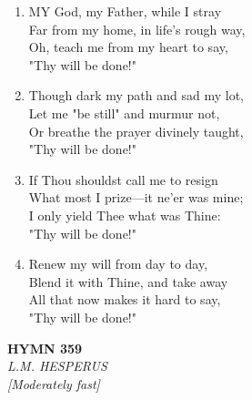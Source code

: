 \begin{enumerate}
    \item MY God, my Father, while I stray \\
        Far from my home, in life's rough way, \\
        Oh, teach me from my heart to say, \\
        "Thy will be done!"

    \item Though dark my path and sad my lot, \\
        Let me "be still" and murmur not, \\
        Or breathe the prayer divinely taught, \\
        "Thy will be done!"

    \item If Thou shouldst call me to resign \\
        What most I prize---it ne'er was mine; \\
        I only yield Thee what was Thine: \\
        "Thy will be done!"

    \item Renew my will from day to day, \\
        Blend it with Thine, and take away \\
        All that now makes it hard to say, \\
        "Thy will be done!"

\end{enumerate}

\newpage
\begin{center}
    {\Large \textbf{HYMN 359}}
    \\
    \textit{L.M. HESPERUS}
    \\
    \textit{\small [Moderately fast]}
\end{center}
\vspace{1em}

